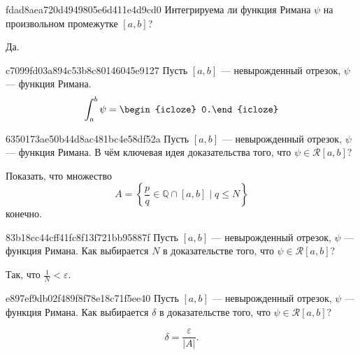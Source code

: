 \begin{note}{fdad8aea720d4949805e6d411e4d9cd0}
    Интегрируема ли функция Римана \({ \psi }\) на произвольном промежутке \({ [a, b] }\)?

    \begin{cloze}{1}
        Да.
    \end{cloze}
\end{note}

\begin{note}{c7099fd03a894c53b8c80146045e9127}
    Пусть \({ [a, b]  }\) --- невырожденный отрезок, \({ \psi }\) --- функция Римана.
    \[
        \int_{a}^{b} \psi = \begin{icloze}{1}0.\end{icloze}
    \]
\end{note}

\begin{note}{6350173ae50b44d8ac481bc4e58df52a}
    Пусть \({ [a, b]  }\) --- невырожденный отрезок, \({ \psi }\) --- функция Римана.
    В чём ключевая идея доказательства того, что \({ \psi \in \mathcal R[a, b] }\)?

    \begin{cloze}{1}
        Показать, что множество
        \[
            A = \left\{ \frac{p}{q} \in \mathbb Q \cap [a, b] \mid q \leqslant N \right\}
        \]
        конечно.
    \end{cloze}
\end{note}

\begin{note}{83b18cc44cff41fc8f13f721bb95887f}
    Пусть \({ [a, b]  }\) --- невырожденный отрезок, \({ \psi }\) --- функция Римана.
    Как выбирается \({ N }\) в доказательстве того, что \({ \psi \in \mathcal R[a, b] }\)?

    \begin{cloze}{1}
        Так, что \({ \frac{1}{N} < \varepsilon }\).
    \end{cloze}
\end{note}

\begin{note}{e897ef9db02f489f8f78e18c71f5ee40}
    Пусть \({ [a, b]  }\) --- невырожденный отрезок, \({ \psi }\) --- функция Римана.
    Как выбирается \({ \delta }\) в доказательстве того, что \({ \psi \in \mathcal R[a, b] }\)?

    \begin{cloze}{1}
        \[
            \delta = \frac{\varepsilon}{\left\lvert A \right\rvert}.
        \]
    \end{cloze}
\end{note}

